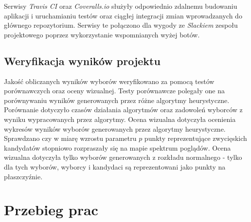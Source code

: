 \documentclass[pdflatex,11pt]{../aghdoc_version2}
\newlength\tindent
\renewcommand{\indent}{\hspace*{\tindent}}
\begin{document}
\indent Serwisy \textit{Travis CI} oraz \textit{Coveralls.io} służyły odpowiednio zdalnemu budowaniu aplikacji i
uruchamianiu testów oraz ciągłej integracji zmian wprowadzanych do głównego
repozytorium. Serwisy te połączono dla wygody ze \textit{Slackiem} zespołu projektowego poprzez
wykorzystanie wspomnianych wyżej botów.

\section{Weryfikacja wyników projektu}
Jakość obliczanych wyników wyborów weryfikowano za pomocą testów
porównawczych oraz oceny wizualnej. Testy porównawcze polegały one na porównywaniu wyników generowanych przez różne
algorytmy heurystyczne. Porównanie dotyczyło czasów działania algorytmów oraz zadowoleń wyborców z wyniku wypracowanych przez algorytmy. Ocena wizualna dotyczyła ocenienia wykresów wyników wyborów generowanych przez algorytmy heurystyczne. Sprawdzano czy w miarę wzrostu parametru $p$ punkty reprezentujące zwycięskich kandydatów stopniowo rozpraszały się na mapie spektrum poglądów. Ocena wizualna dotyczyła tylko wyborów generowanych z rozkładu normalnego - tylko dla tych wyborów, wyborcy i kandydaci są reprezentowani jako punkty na płaszczyźnie.

\chapter{Przebieg prac}
\end{document}
